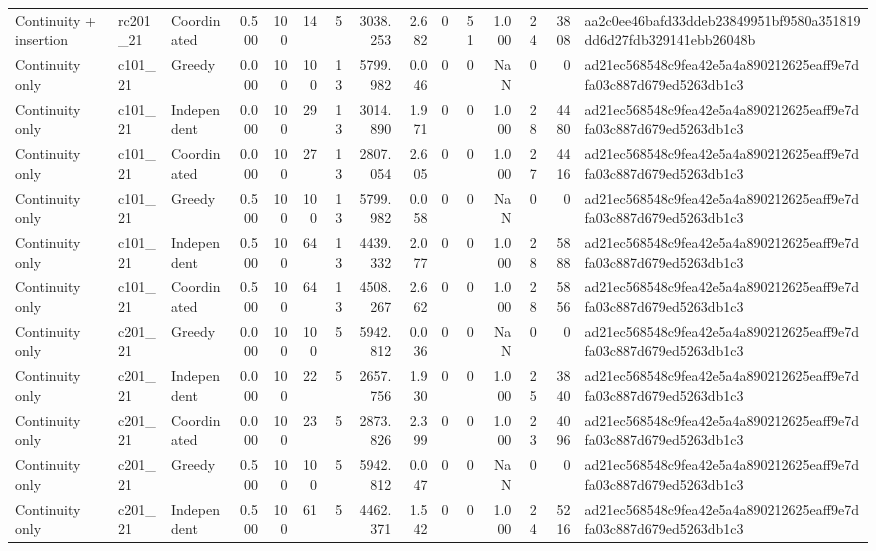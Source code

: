 \begin{tabular}{lllrrrrrrrrrrrl}
Continuity + insertion & rc201\_21 & Coordinated & 0.500 & 100 & 14 & 5 & 3038.253 & 2.682 & 0 & 51 & 1.000 & 24 & 3808 & aa2c0ee46bafd33ddeb23849951bf9580a351819dd6d27fdb329141ebb26048b \\
Continuity only & c101\_21 & Greedy & 0.000 & 100 & 100 & 13 & 5799.982 & 0.046 & 0 & 0 & NaN & 0 & 0 & ad21ec568548c9fea42e5a4a890212625eaff9e7dfa03c887d679ed5263db1c3 \\
Continuity only & c101\_21 & Independent & 0.000 & 100 & 29 & 13 & 3014.890 & 1.971 & 0 & 0 & 1.000 & 28 & 4480 & ad21ec568548c9fea42e5a4a890212625eaff9e7dfa03c887d679ed5263db1c3 \\
Continuity only & c101\_21 & Coordinated & 0.000 & 100 & 27 & 13 & 2807.054 & 2.605 & 0 & 0 & 1.000 & 27 & 4416 & ad21ec568548c9fea42e5a4a890212625eaff9e7dfa03c887d679ed5263db1c3 \\
Continuity only & c101\_21 & Greedy & 0.500 & 100 & 100 & 13 & 5799.982 & 0.058 & 0 & 0 & NaN & 0 & 0 & ad21ec568548c9fea42e5a4a890212625eaff9e7dfa03c887d679ed5263db1c3 \\
Continuity only & c101\_21 & Independent & 0.500 & 100 & 64 & 13 & 4439.332 & 2.077 & 0 & 0 & 1.000 & 28 & 5888 & ad21ec568548c9fea42e5a4a890212625eaff9e7dfa03c887d679ed5263db1c3 \\
Continuity only & c101\_21 & Coordinated & 0.500 & 100 & 64 & 13 & 4508.267 & 2.662 & 0 & 0 & 1.000 & 28 & 5856 & ad21ec568548c9fea42e5a4a890212625eaff9e7dfa03c887d679ed5263db1c3 \\
Continuity only & c201\_21 & Greedy & 0.000 & 100 & 100 & 5 & 5942.812 & 0.036 & 0 & 0 & NaN & 0 & 0 & ad21ec568548c9fea42e5a4a890212625eaff9e7dfa03c887d679ed5263db1c3 \\
Continuity only & c201\_21 & Independent & 0.000 & 100 & 22 & 5 & 2657.756 & 1.930 & 0 & 0 & 1.000 & 25 & 3840 & ad21ec568548c9fea42e5a4a890212625eaff9e7dfa03c887d679ed5263db1c3 \\
Continuity only & c201\_21 & Coordinated & 0.000 & 100 & 23 & 5 & 2873.826 & 2.399 & 0 & 0 & 1.000 & 23 & 4096 & ad21ec568548c9fea42e5a4a890212625eaff9e7dfa03c887d679ed5263db1c3 \\
Continuity only & c201\_21 & Greedy & 0.500 & 100 & 100 & 5 & 5942.812 & 0.047 & 0 & 0 & NaN & 0 & 0 & ad21ec568548c9fea42e5a4a890212625eaff9e7dfa03c887d679ed5263db1c3 \\
Continuity only & c201\_21 & Independent & 0.500 & 100 & 61 & 5 & 4462.371 & 1.542 & 0 & 0 & 1.000 & 24 & 5216 & ad21ec568548c9fea42e5a4a890212625eaff9e7dfa03c887d679ed5263db1c3 \\

\end{tabular}
